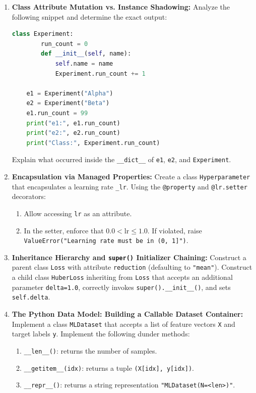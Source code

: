\begin{enumerate}
    \item \textbf{Class Attribute Mutation vs. Instance Shadowing:}
    Analyze the following snippet and determine the exact output:
    \begin{lstlisting}[language=Python]
    class Experiment:
        run_count = 0
        def __init__(self, name):
            self.name = name
            Experiment.run_count += 1

    e1 = Experiment("Alpha")
    e2 = Experiment("Beta")
    e1.run_count = 99
    print("e1:", e1.run_count)
    print("e2:", e2.run_count)
    print("Class:", Experiment.run_count)
    \end{lstlisting}
    Explain what occurred inside the \texttt{\_\_dict\_\_} of \texttt{e1}, \texttt{e2}, and \texttt{Experiment}.

    \item \textbf{Encapsulation via Managed Properties:}
    Create a class \texttt{Hyperparameter} that encapsulates a learning rate \texttt{\_lr}.
    Using the \texttt{@property} and \texttt{@lr.setter} decorators:
    \begin{enumerate}
        \item Allow accessing \texttt{lr} as an attribute.
        \item In the setter, enforce that $0.0 < \text{lr} \le 1.0$. If violated, raise \texttt{ValueError("Learning rate must be in (0, 1]")}.
    \end{enumerate}

    \item \textbf{Inheritance Hierarchy and \texttt{super()} Initializer Chaining:}
    Construct a parent class \texttt{Loss} with attribute \texttt{reduction} (defaulting to \texttt{"mean"}).
    Construct a child class \texttt{HuberLoss} inheriting from \texttt{Loss} that accepts an additional parameter \texttt{delta=1.0}, correctly invokes \texttt{super().\_\_init\_\_()}, and sets \texttt{self.delta}.

    \item \textbf{The Python Data Model: Building a Callable Dataset Container:}
    Implement a class \texttt{MLDataset} that accepts a list of feature vectors \texttt{X} and target labels \texttt{y}.
    Implement the following dunder methods:
    \begin{enumerate}
        \item \texttt{\_\_len\_\_()}: returns the number of samples.
        \item \texttt{\_\_getitem\_\_(idx)}: returns a tuple \texttt{(X[idx], y[idx])}.
        \item \texttt{\_\_repr\_\_()}: returns a string representation \texttt{"MLDataset(N=<len>)"}.
    \end{enumerate}


\end{enumerate}
